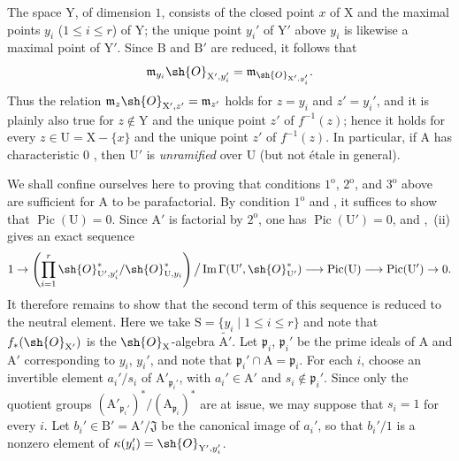 \begin{env}[21.13.9]
The space $\mathrm{Y}$, of dimension $1$, consists of the closed point $x$ of $\mathrm{X}$ and the maximal points $y_i$ ($1\leq i\leq r$) of $\mathrm{Y}$; the unique point $y_i'$ of $\mathrm{Y}'$ above $y_i$ is likewise a maximal point of $\mathrm{Y}'$. Since $\mathrm{B}$ and $\mathrm{B}'$ are reduced, it follows that
\[
  \mathfrak{m}_{y_i}\sh{O}_{\mathrm{X}',y_i'}=\mathfrak{m}_{\sh{O}_{\mathrm{X}',y_i'}}.
\]
Thus the relation $\mathfrak{m}_z\sh{O}_{\mathrm{X}',z'}=\mathfrak{m}_{z'}$ holds for $z=y_i$ and $z'=y_i'$, and it is plainly also true for $z\notin\mathrm{Y}$ and the unique point $z'$ of $f^{-1}(z)$; hence it holds for every $z\in\mathrm{U}=\mathrm{X}-\{x\}$ and the unique point $z'$ of $f^{-1}(z)$. In particular, if $\mathrm{A}$ has characteristic $0$ , then $\mathrm{U}'$ is \emph{unramified} over $\mathrm{U}$ (but not \'etale in general).

We shall confine ourselves here to proving that conditions $1^{\mathrm{o}}$, $2^{\mathrm{o}}$, and $3^{\mathrm{o}}$ above are sufficient for $\mathrm{A}$ to be parafactorial. By condition $1^{\mathrm{o}}$ and , it suffices to show that $\operatorname{Pic}(\mathrm{U})=0$. Since $\mathrm{A}'$ is factorial by $2^{\mathrm{o}}$, one has $\operatorname{Pic}(\mathrm{U}')=0$, and ,~(ii) gives an exact sequence
\[
  1\to
  \left(\prod_{i=1}^r \sh{O}_{\mathrm{U}',y_i'}^*/\sh{O}_{\mathrm{U},y_i}^*\right)
  \big/\operatorname{Im}\Gamma(\mathrm{U}',\sh{O}_{\mathrm{U}'}^*)
  \longrightarrow\operatorname{Pic}(\mathrm{U})\longrightarrow\operatorname{Pic}(\mathrm{U}')\to 0.
\]
It therefore remains to show that the second term of this sequence is reduced to the neutral element. Here we take $\mathrm{S}=\{y_i\mid 1\leq i\leq r\}$ and note that $f_*(\sh{O}_{\mathrm{X}'})$ is the $\sh{O}_{\mathrm{X}}$-algebra $\widetilde{\mathrm{A}'}$. Let $\mathfrak{p}_i$, $\mathfrak{p}_i'$ be the prime ideals of $\mathrm{A}$ and $\mathrm{A}'$ corresponding to $y_i$, $y_i'$, and note that $\mathfrak{p}_i'\cap\mathrm{A}=\mathfrak{p}_i$. For each $i$, choose an invertible element $a_i'/s_i$ of $\mathrm{A}'_{\mathfrak{p}_i'}$, with $a_i'\in\mathrm{A}'$ and $s_i\notin\mathfrak{p}_i'$. Since only the quotient groups $(\mathrm{A}'_{\mathfrak{p}_i'})^*/(\mathrm{A}_{\mathfrak{p}_i})^*$ are at issue, we may suppose that $s_i=1$ for every $i$. Let $b_i'\in\mathrm{B}'=\mathrm{A}'/\mathfrak{J}$ be the canonical image of $a_i'$, so that $b_i'/1$ is a nonzero element of $\kappa(y_i')=\sh{O}_{\mathrm{Y}',y_i'}$.


\end{env}
